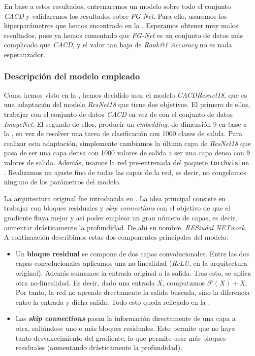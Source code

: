 En base a estos resultados, entrenaremos un modelo sobre todo el conjunto \textit{CACD} y validaremos los resultados sobre \textit{FG-Net}. Para ello, usaremos los hiperparámetros que hemos encontrado en la . Esperamos obtener muy malos resultados, pues ya hemos comentado que \textit{FG-Net} es un conjunto de datos más complicado que \textit{CACD}, y el valor tan bajo de \textit{Rank@1 Accuracy} no es nada esperanzador.

\subsubsection{Descripción del modelo empleado} \label{isec:explicacion_modelo}

Como hemos visto en la , hemos decidido usar el modelo \textit{CACDResnet18}, que es una adaptación del modelo \textit{ResNet18} que tiene dos objetivos. El primero de ellos, trabajar con el conjunto de datos \textit{CACD} en vez de con el conjunto de datos \textit{ImageNet}. El segundo de ellos, producir un \textit{embedding}, de dimensión 9 en base a la , en vez de resolver una tarea de clasificación con 1000 clases de salida. Para realizar esta adaptación, simplemente cambiamos la última capa de \textit{ResNet18} que pasa de ser una capa densa con 1000 valores de salida a ser una capa densa con 9 valores de salida. Además, usamos la red pre-entrenada del paquete \lstinline{torchvision} \cite{informatica:resnet18_torchvision}. Realizamos un ajuste fino de todas las capas de la red, es decir, no congelamos ninguno de los parámetros del modelo.

La arquitectura original fue introducida en \cite{informatica:resnet_original_paper}. La idea principal consiste en trabajar con bloques residuales y \textit{skip connections} con el objetivo de que el gradiente fluya mejor y así poder emplear un gran número de capas, es decir, aumentar drásticamente la profundidad. De ahí su nombre, \textit{RESiudal NETwork}. A continuación describimos estas dos componentes principales del modelo:

\begin{itemize}
    \item Un \textbf{bloque residual} se compone de dos capas convolucionales. Entre las dos capas convolucionales aplicamos una no-linealidad (\textit{ReLU}, en la arquitectura original). Además sumamos la entrada original a la salida. Tras esto, se aplica otra no-linealidad. Es decir, dado una entrada $X$, computamos $\mathcal{F}(X) + X$. Por tanto, la red no aprende drectamente la salida buscada, sino la diferencia entre la entrada y dicha salida. Todo esto queda reflejado en la .
    \item Las \textbf{\textit{skip connections}} pasan la información directamente de una capa a otra, saltándose uno o más bloques residuales. Esto permite que no haya tanto desvanecimiento del gradiente, lo que permite usar más bloques residuales (aumentando drásticamente la profundidad).
\end{itemize}

